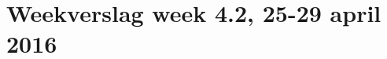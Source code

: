 \documentclass[11pt,a4paper]{article}
\begin{document}
\section*{Weekverslag week 4.2, 25-29 april 2016}




\end{document}
